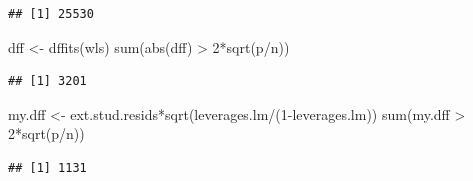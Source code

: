 \documentclass[
]{book}
\newenvironment{Shaded}{\begin{snugshade}}{\end{snugshade}}
\newcommand{\AttributeTok}[1]{\textcolor[rgb]{0.77,0.63,0.00}{#1}}
\newcommand{\DecValTok}[1]{\textcolor[rgb]{0.00,0.00,0.81}{#1}}
\newcommand{\FunctionTok}[1]{\textcolor[rgb]{0.00,0.00,0.00}{#1}}
\newcommand{\NormalTok}[1]{#1}
\newcommand{\OtherTok}[1]{\textcolor[rgb]{0.56,0.35,0.01}{#1}}
\newcommand{\SpecialCharTok}[1]{\textcolor[rgb]{0.00,0.00,0.00}{#1}}
\newcommand{\StringTok}[1]{\textcolor[rgb]{0.31,0.60,0.02}{#1}}
\begin{document}
\begin{verbatim}
## [1] 25530
\end{verbatim}

\begin{Shaded}
\begin{Highlighting}[]
\NormalTok{dff }\OtherTok{\textless{}{-}} \FunctionTok{dffits}\NormalTok{(wls)}
\FunctionTok{sum}\NormalTok{(}\FunctionTok{abs}\NormalTok{(dff) }\SpecialCharTok{\textgreater{}} \DecValTok{2}\SpecialCharTok{*}\FunctionTok{sqrt}\NormalTok{(p}\SpecialCharTok{/}\NormalTok{n))}
\end{Highlighting}
\end{Shaded}

\begin{verbatim}
## [1] 3201
\end{verbatim}

\begin{Shaded}
\begin{Highlighting}[]
\NormalTok{my.dff }\OtherTok{\textless{}{-}}\NormalTok{ ext.stud.resids}\SpecialCharTok{*}\FunctionTok{sqrt}\NormalTok{(leverages.lm}\SpecialCharTok{/}\NormalTok{(}\DecValTok{1}\SpecialCharTok{{-}}\NormalTok{leverages.lm))}
\FunctionTok{sum}\NormalTok{(my.dff }\SpecialCharTok{\textgreater{}} \DecValTok{2}\SpecialCharTok{*}\FunctionTok{sqrt}\NormalTok{(p}\SpecialCharTok{/}\NormalTok{n))}
\end{Highlighting}
\end{Shaded}

\begin{verbatim}
## [1] 1131
\end{verbatim}

\begin{Shaded}
\end{Shaded}
\end{document}
